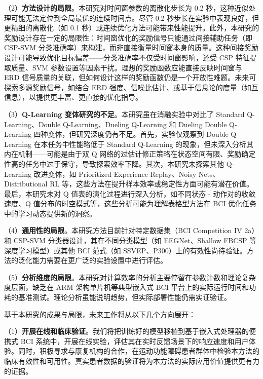 （2）\textbf{方法设计的局限}。本研究对时间窗参数的离散化步长为 0.2 秒，这种近似处理可能无法定位到全局最优的连续时间点。尽管 0.2 秒步长在实验中表现良好，但更精细的离散化（如 0.1 秒）或连续优化方法可能带来性能提升。此外，本研究的奖励设计存在一定的局限性：时间窗优化的奖励信号只能通过间接辅助任务（即 CSP-SVM 分类准确率）来构建，而非直接衡量时间窗本身的质量。这种间接奖励设计可能导致优化目标偏差——分类准确率不仅受时间窗影响，还受 CSP 特征提取质量、SVM 参数设置等因素干扰。理想的奖励函数应能直接反映时间窗与 ERD 信号质量的关联\cite{pfurtscheller1999event}，但如何设计这样的奖励函数仍是一个开放性难题。未来可探索多源奖励信号，如结合 ERD 强度、信噪比估计、或基于信息论的度量（如互信息），以提供更丰富、更直接的优化指导。

（3）\textbf{Q-Learning 变体研究的不足}。本研究虽在消融实验中对比了 Standard Q-Learning、Double Q-Learning、Dueling Q-Learning 和 Dueling Double Q-Learning 四种变体，但研究深度仍有不足。首先，实验仅观察到 Double Q-Learning 在本任务中性能略低于 Standard Q-Learning 的现象，但未深入分析其内在机制——可能是由于双 Q 网络的过估计修正策略在状态空间有限、奖励确定性高的任务中过于保守，导致探索效率下降。其次，本研究未探索其他 Q-Learning 改进变体，如 Prioritized Experience Replay\cite{schaul2015prioritized}、Noisy Nets\cite{fortunato2018noisy}、Distributional RL\cite{bellemare2017distributional} 等，这些方法在提升样本效率或稳定性方面可能有潜在价值。最后，本研究未对 Q 值表的演化过程进行深入分析，如不同状态 - 动作对的收敛速度、Q 值分布的时空模式等，这些分析可能为理解表格型方法在 BCI 优化任务中的学习动态提供新的洞察。

（4）\textbf{通用性的局限}。本研究方法目前针对特定数据集（BCI Competition IV 2a）和 CSP-SVM 分类器设计，其在不同分类模型（如 EEGNet\cite{lawhern2018eegnet}、Shallow FBCSP\cite{ang2008filter} 等深度学习模型）或其他 BCI 范式（如 SSVEP、P300）上的有效性尚待验证。方法的泛化能力需要在更广泛的实验设置中进行评估。

（5）\textbf{分析维度的局限}。本研究对计算效率的分析主要停留在参数计数和理论复杂度层面，缺乏在 ARM 架构单片机等典型嵌入式 BCI 平台上的实际运行时间和功耗的基准测试。理论分析虽能说明趋势，但实际部署性能仍需实证验证。

\label{sec:future_work}

基于本研究的成果与局限，未来工作将从以下几个方向展开：

（1）\textbf{开展在线和临床验证}。我们将把训练好的模型移植到基于嵌入式处理器的便携式 BCI 系统中，开展在线实验，评估其在实时反馈场景下的响应速度和用户体验。同时，积极寻求与康复机构的合作，在运动功能障碍患者群体中检验本方法的临床有效性和可用性。真实患者数据的验证将为本方法的实际应用价值提供更有力的证据。

